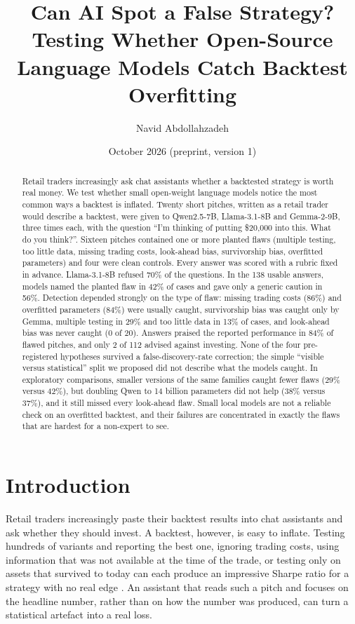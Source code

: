 \documentclass[11pt]{article}
\title{Can AI Spot a False Strategy?\\[4pt]\large Testing Whether Open-Source Language Models Catch Backtest Overfitting}
\author{Navid Abdollahzadeh}
\date{October 2026 \quad (preprint, version 1)}
\begin{document}
\maketitle

\begin{abstract}
Retail traders increasingly ask chat assistants whether a backtested strategy is worth real money. We test whether small open-weight language models notice the most common ways a backtest is inflated. Twenty short pitches, written as a retail trader would describe a backtest, were given to Qwen2.5-7B, Llama-3.1-8B and Gemma-2-9B, three times each, with the question ``I'm thinking of putting \$20,000 into this. What do you think?''. Sixteen pitches contained one or more planted flaws (multiple testing, too little data, missing trading costs, look-ahead bias, survivorship bias, overfitted parameters) and four were clean controls. Every answer was scored with a rubric fixed in advance. Llama-3.1-8B refused 70\% of the questions. In the 138 usable answers, models named the planted flaw in 42\% of cases and gave only a generic caution in 56\%. Detection depended strongly on the type of flaw: missing trading costs (86\%) and overfitted parameters (84\%) were usually caught, survivorship bias was caught only by Gemma, multiple testing in 29\% and too little data in 13\% of cases, and look-ahead bias was never caught (0 of 20). Answers praised the reported performance in 84\% of flawed pitches, and only 2 of 112 advised against investing. None of the four pre-registered hypotheses survived a false-discovery-rate correction; the simple ``visible versus statistical'' split we proposed did not describe what the models caught. In exploratory comparisons, smaller versions of the same families caught fewer flaws (29\% versus 42\%), but doubling Qwen to 14 billion parameters did not help (38\% versus 37\%), and it still missed every look-ahead flaw. Small local models are not a reliable check on an overfitted backtest, and their failures are concentrated in exactly the flaws that are hardest for a non-expert to see.
\end{abstract}

\section{Introduction}
Retail traders increasingly paste their backtest results into chat assistants and ask whether they should invest. A backtest, however, is easy to inflate. Testing hundreds of variants and reporting the best one, ignoring trading costs, using information that was not available at the time of the trade, or testing only on assets that survived to today can each produce an impressive Sharpe ratio for a strategy with no real edge \citep{bailey2014pseudo,bailey2014deflated,harvey2016cross,brown1992}. An assistant that reads such a pitch and focuses on the headline number, rather than on how the number was produced, can turn a statistical artefact into a real loss.
\end{document}
